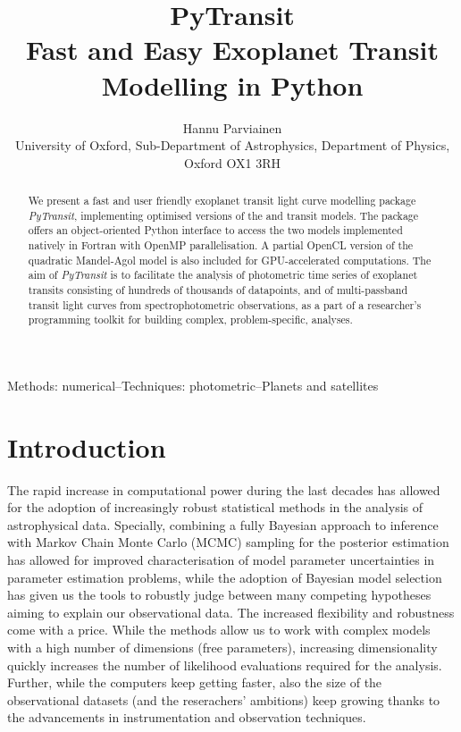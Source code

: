 \documentclass[usenatbib,usegraphicx,useAMS]{mn2e}
\title[PyTransit]{PyTransit\\ Fast and Easy Exoplanet Transit Modelling in Python}
\author[H. Parviainen]{Hannu Parviainen\\University of Oxford, Sub-Department of Astrophysics, Department of Physics, Oxford OX1 3RH}
\newcommand{\pytransit}{\textit{PyTransit}\xspace}
\begin{document}

\maketitle
\begin{abstract}
We present a fast and user friendly exoplanet transit light curve modelling package \pytransit, implementing 
optimised versions of the \cite{Gimenez2006} and \cite{Mandel2002} transit models.  The package offers an 
object-oriented Python interface to access the two models implemented natively in Fortran with OpenMP 
parallelisation. A partial OpenCL version of the quadratic Mandel-Agol model is also included for GPU-accelerated 
computations. The aim of \pytransit is to facilitate the analysis of photometric time series of exoplanet 
transits consisting of hundreds of thousands of datapoints, and of multi-passband transit light curves from 
spectrophotometric observations, as a part of a researcher’s programming toolkit for building complex, 
problem-specific, analyses.
\end{abstract}
\begin{keywords}
 Methods: numerical--Techniques: photometric--Planets and satellites
\end{keywords}

\section{Introduction}
\label{sec:introduction}
The rapid increase in computational power during the last decades has allowed for the adoption of increasingly robust 
statistical methods in the analysis of astrophysical data. Specially, combining a fully Bayesian approach to inference 
with Markov Chain Monte Carlo (MCMC) sampling for the posterior estimation has allowed for improved characterisation of 
model parameter uncertainties in parameter estimation problems, while the adoption of Bayesian model selection has given 
us the tools to robustly judge between many competing hypotheses aiming to explain our observational data. The increased 
flexibility and robustness come with a price. While the methods allow us to work with complex models with a high number 
of dimensions (free  parameters), increasing dimensionality quickly increases the number of likelihood evaluations 
required for the analysis. Further, while the computers keep getting faster, also the size of the observational datasets 
(and the reserachers' ambitions) keep growing thanks to the advancements in instrumentation and observation techniques.
\end{document}
